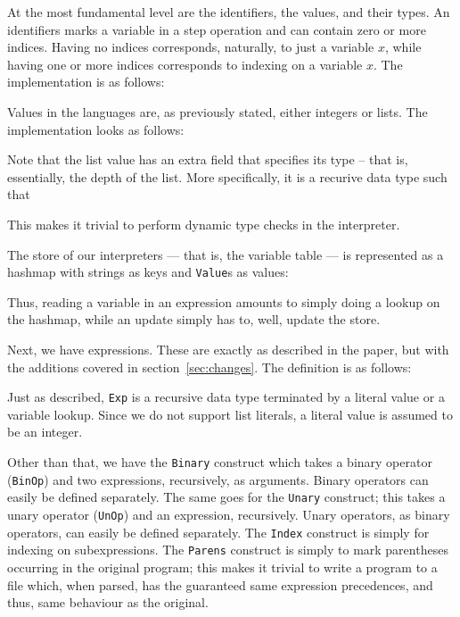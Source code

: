 At the most fundamental level are the identifiers, the values, and their types. An identifiers marks a variable in a step operation and can contain zero or more indices. Having no indices corresponds, naturally, to just a variable $x$, while having one or more indices corresponds to indexing on a variable $x$. The implementation is as follows:

Values in the languages are, as previously stated, either integers or lists. The implementation looks as follows:

Note that the list value has an extra field that specifies its type -- that is, essentially, the depth of the list. More specifically, it is a recurive data type such that

This makes it trivial to perform dynamic type checks in the interpreter.

The store of our interpreters --- that is, the variable table --- is represented as a hashmap with strings as keys and \texttt{Value}s as values:

Thus, reading a variable in an expression amounts to simply doing a lookup on the hashmap, while an update simply has to, well, update the store.

Next, we have expressions. These are exactly as described in the paper, but with the additions covered in section~\ref{sec:changes}. The definition is as follows:

Just as described, \texttt{Exp} is a recursive data type terminated by a literal value or a variable lookup. Since we do not support list literals, a literal value is assumed to be an integer.


Other than that, we have the \texttt{Binary} construct which takes a binary operator (\texttt{BinOp}) and two expressions, recursively, as arguments. Binary operators can easily be defined separately. The same goes for the \texttt{Unary} construct; this takes a unary operator (\texttt{UnOp}) and an expression, recursively. Unary operators, as binary operators, can easily be defined separately. The \texttt{Index} construct is simply for indexing on subexpressions. The \texttt{Parens} construct is simply to mark parentheses occurring in the original program; this makes it trivial to write a program to a file which, when parsed, has the guaranteed same expression precedences, and thus, same behaviour as the original.

